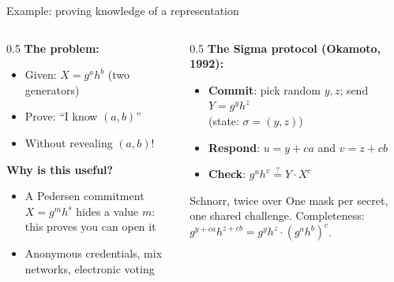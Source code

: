 \ifdefined\PRESENTATION\else\PassOptionsToClass{handout}{beamer}\fi\documentclass[aspectratio=169, lualatex]{beamer}
\begin{document}
\begin{frame}{Example: proving knowledge of a representation}
	\begin{columns}[c]
		\begin{column}{0.5\textwidth}
			\textbf{The problem:}
			\begin{itemize}
				\item Given: $X = g^a h^b$ (two generators)
				\item Prove: ``I know $(a, b)$''
				\item Without revealing $(a, b)$!
			\end{itemize}
			\textbf{Why is this useful?}
			\begin{itemize}
				\item A Pedersen commitment $X = g^m h^s$ hides a value $m$: this proves you can open it
				\item Anonymous credentials, mix networks, electronic voting
			\end{itemize}
		\end{column}
		\begin{column}{0.5\textwidth}
			\textbf{The Sigma protocol (Okamoto, 1992):}
			\begin{itemize}
				\item \textbf{Commit}: pick random $y, z$; send $Y = g^y h^z$ \\(state: $\sigma = (y, z)$)
				\item \textbf{Respond}: $u = y + ca$ and $v = z + cb$
				\item \textbf{Check}: $g^u h^v \overset{?}{=} Y \cdot X^c$
			\end{itemize}
			\begin{exampleblock}{Schnorr, twice over}
				One mask per secret, one shared challenge. Completeness: $g^{y + ca} h^{z + cb} = g^y h^z \cdot (g^a h^b)^c$.
			\end{exampleblock}
		\end{column}
	\end{columns}
\end{frame}
\end{document}
